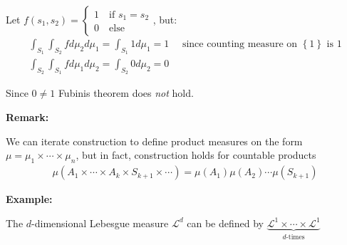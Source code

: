 \noindent Let $f(s_1,s_2) = \begin{cases}1\quad\text{if } s_1 = s_2\\0\quad\text{else}\end{cases}$, but:
\begin{equation*}
  \begin{gathered}
  \int_{S_1}\int_{S_2}fd\mu_2d\mu_1 =\int_{S_1}1d\mu_1 = 1\quad\text{ since counting measure on $\left\{1\right\}$ is 1}\\
  \int_{S_2}\int_{S_1}fd\mu_1d\mu_2 = \int_{S_2}0d\mu_2 = 0
  \end{gathered}
\end{equation*}\par
\noindent Since $0\neq1$ Fubinis theorem does \textit{not} hold.
\par\bigskip
\noindent\textbf{Remark:}\par
\noindent We can iterate construction to define product measures on the form $\mu = \mu_1\times\cdots\times\mu_n$, but in fact, construction holds for countable products
\begin{equation*}
  \begin{gathered}
    \mu(A_1\times\cdots\times A_k\times S_{k+1}\times\cdots) = \mu(A_1)\mu(A_2)\cdots\mu(S_{k+1})
  \end{gathered}
\end{equation*}
\par\bigskip
\noindent\textbf{Example:}\par
\noindent The $d$-dimensional Lebesgue measure $\mathcal{L}^d$ can be defined by $\underbrace{\mathcal{L}^1\times\cdots\times\mathcal{L}^1}_{\text{$d$-times}}$
\par\bigskip

